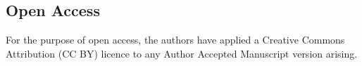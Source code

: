 \documentclass[pdflatex,sn-mathphys-num]{sn-jnl}%
\begin{document}
\subsection*{Open Access}
For the purpose of open access, the authors have applied a Creative Commons Attribution (CC BY) licence to any Author Accepted Manuscript version arising.












\end{document}
